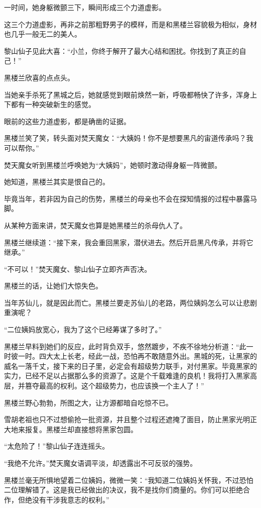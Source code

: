 \begin{this_body}
一时间，她身躯微颤三下，瞬间形成三个力道虚影。

这三个力道虚影，再非之前那粗野男子的模样，而是和黑楼兰容貌极为相似，身材也几乎一般无二的美人。

黎山仙子见此大喜：“小兰，你终于解开了最大心结和困扰。你找到了真正的自己！”

黑楼兰欣喜的点点头。

当她亲手杀死了黑城之后，她就感觉到眼前焕然一新，呼吸都畅快了许多，浑身上下都有一种突破新生的感觉。

眼前的这些力道虚影，都是确凿的证据。

黑楼兰笑了笑，转头面对焚天魔女：“大姨妈！你不是想要黑凡的宙道传承吗？我可以帮你。”

焚天魔女听到黑楼兰呼唤她为“大姨妈”，她顿时激动得身躯一阵微颤。

她知道，黑楼兰其实是恨自己的。

毕竟当年，若非因为自己的伤势，黑楼兰的母亲也不会在探知情报的过程中暴露马脚。

从某种方面来讲，焚天魔女也算是她黑楼兰的杀母仇人了。

黑楼兰继续道：“接下来，我会重回黑家，潜伏进去。然后开启黑凡传承，并将它继承。”

“不可以！”焚天魔女、黎山仙子立即齐声否决。

黑楼兰的话，让她们大惊失色。

当年苏仙儿，就是因此而亡。黑楼兰要走苏仙儿的老路，两位姨妈怎么可以让悲剧重演呢？

“二位姨妈放宽心，我为了这个已经筹谋了多时了。”

黑楼兰早料到她们的反应，此时背负双手，悠然踱步，不疾不徐地分析道：“此一时彼一时。四大太上长老，经此一战，恐怕再不敢随意外出。黑城的死，让黑家的威名一落千丈，接下来的日子里，必定会有超级势力联手，对付黑家。毕竟黑家的实力，已经不足以占据那么多的资源了。这是个千载难逢的良机！我将打入黑家高层，并篡夺最高的权利。这个超级势力，也应该换一个主人了！”

黑楼兰野心勃勃，所图之大，让方源都暗自吃惊不已。

雪胡老祖也只不过想偷抢一批资源，并且整个过程还遮掩了面目，防止黑家光明正大地来报复。黑楼兰却直接想将黑家包圆。

“太危险了！”黎山仙子连连摇头。

“我绝不允许。”焚天魔女语调平淡，却透露出不可反驳的强势。

黑楼兰毫无所惧地望着二位姨妈，微微一笑：“我知道二位姨妈关怀我，不过恐怕二位理解错了。这是我已经做出的决议，我不是找你们商量的。你们可以拒绝合作，但绝没有干涉我意志的权利。”


\end{this_body}
